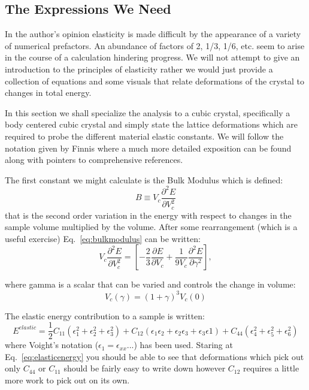 \subsection{The Expressions We Need}
In the author's opinion elasticity is made difficult by the appearance of a variety
of numerical prefactors. An abundance of factors of 2,
1/3, 1/6, etc. seem to arise in the course of a calculation hindering progress. 
We will not attempt to give an introduction to the principles of elasticity rather
we would just provide a collection of equations and some visuals 
that relate deformations of the crystal to changes in total energy.

In this section we shall specialize the analysis to a cubic crystal, specifically a body centered cubic
crystal and simply state the lattice deformations which are required to probe the 
different material elastic constants. We will follow the notation given by Finnis where
a much more detailed exposition can be found along with pointers to comprehensive references.

The first constant we might calculate is the Bulk Modulus which is defined:
%
\begin{equation}
\label{eq:bulkmodulus}
B\equiv V_{c} \frac{\partial^{2} E}{\partial V_{c}^{2}}
\end{equation}
%
that is the second order variation in the energy with respect to changes in the 
sample volume multiplied by the volume. After some rearrangement (which is a useful
exercise) Eq.~\ref{eq:bulkmodulus} can be written:
%
\begin{equation}
V_{c}\frac{\partial^{2} E}{\partial V_{c}^{2}} = \left[-\frac{2}{3}\frac{\partial E}{\partial V_{c}}+\frac{1}{9V_{c}}\frac{\partial^{2}E}{\partial \gamma^{2}} \right],
\end{equation}

where gamma is a scalar that can be varied and controls the change in volume:
%
\begin{equation}
V_{c}(\gamma) = (1+\gamma)^{3}V_{c}(0)
\end{equation}
%

The elastic energy contribution to a sample is written:
%
\begin{equation}
\label{eq:eq:elasticenergy}
E^{elastic} = \frac{1}{2}C_{11}(\epsilon^{2}_{1} + \epsilon^{2}_{2} + \epsilon^{2}_{3}) + C_{12}(\epsilon_{1}\epsilon_{2}
+\epsilon_{2}\epsilon_{3} + \epsilon_{3}\epsilon{1}) + C_{44}(\epsilon^{2}_{4} + \epsilon^{2}_{5} + \epsilon^{2}_{6})
\end{equation}
%
where Voight's notation ($\epsilon_{1}=\epsilon_{xx}$...) has been used. Staring at Eq.~\ref{eq:elasticenergy} you
should be able to see that deformations which pick out only $C_{44}$ or $C_{11}$ should be fairly easy to write down
however $C_{12}$ requires a little more work to pick out on its own.

